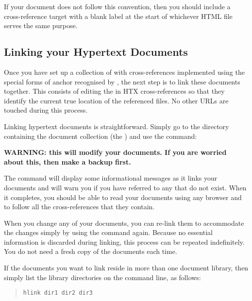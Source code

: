 If your document does not follow this convention, then you should
include a cross-reference target with a blank label at the start of
whichever HTML file serves the same purpose.

\subsection{\label{sect:howtolink}Linking your Hypertext Documents}

Once you have set up a collection of  with
cross-references implemented using the special forms of 
anchor recognised by , the next step is to link these
documents together.  This consists of editing the  in HTX
cross-references so that they identify the current true location of
the referenced files. No other URLs are touched during this process.

Linking hypertext documents is straightforward. Simply go to the
directory containing the document collection (the ) and use the command:

\begin{quote}
\end{quote}

{\bf WARNING: this will modify your documents. If you are worried
about this, then make a backup first.}

The  command will display some informational messages as it
links your documents and will warn you if you have referred to any
 that do not exist.  When it completes,
you should be able to read your documents using any 
browser and to follow all the cross-references that they contain.

When you change any of your documents, you can re-link them to
accommodate the changes simply by using the  command
again. Because no essential information is discarded during linking,
this process can be repeated indefinitely. You do not need a fresh
copy of the documents each time.

If the documents you want to link reside in more than one document
library, then simply list the library directories on the command line,
as follows:

\begin{quote}
\begin{verbatim}
hlink dir1 dir2 dir3
\end{verbatim}
\end{quote}

